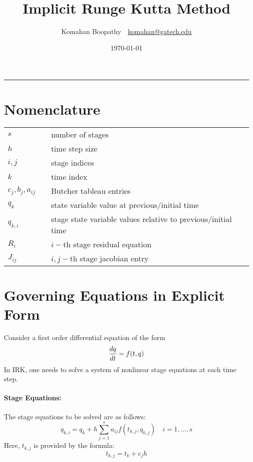 \documentclass[pdftex,11pt,letter]{article}
\title{\textbf{Implicit Runge Kutta Method}}
\author{Komahan Boopathy~~\url{komahan@gatech.edu}} \date{\today}
\begin{document}
\maketitle
\vspace{-0.25in}
\rule{\linewidth}{2pt}



\section*{Nomenclature}
\begin{minipage}[b]{0.5\linewidth}\centering
\begin{tabular}{@{}lcl@{}}
$s$   && number of stages\\
$h$   && time step size \\
$i,j$ && stage indices \\
$k$   && time index \\
$c_j,b_j,a_{ij}$ && Butcher tableau entries \\
$q_k$ && state variable value at previous/initial time \\
$q_{k,i}$ && stage state variable values relative to previous/initial time \\
$R_i$  && $i-$th stage residual equation \\
$J_{ij}$  && $i,j-$th stage jacobian entry \\
\end{tabular}
\end{minipage}


\section{Governing Equations in Explicit Form}

Consider a first order differential equation  of the form
\begin{equation}
  \dfrac{d q}{d t} = f(t, q)
\end{equation}
In IRK, one needs to solve a system of nonlinear stage equations at
each time step. 
\paragraph{Stage Equations:}
The stage equations to be solved are as follows:
\begin{equation}\label{stage_explicit}
  q_{k,i} = q_{k} + h \sum_{j=1}^s a_{ij} f(t_{k,j}, q_{k,j}) \quad i = 1,\ldots,s 
\end{equation}
Here, $t_{k,j}$ is provided by the formula:
\begin{equation}
  t_{k,j} = t_k + c_j h
\end{equation}
\end{document}
